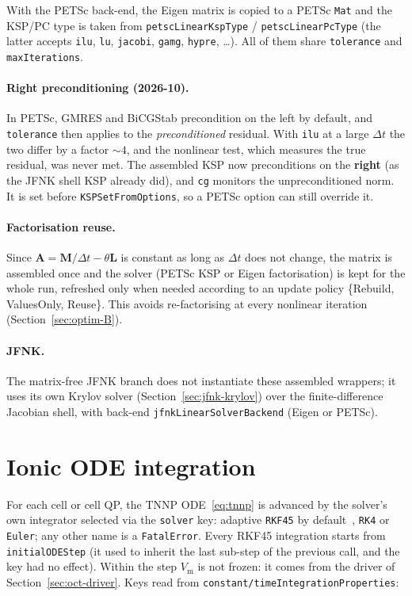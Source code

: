 \documentclass[11pt,a4paper]{article}
\newcommand{\code}[1]{\texttt{\small #1}}
\newcommand{\Vm}{V_{\text{m}}}
\newcommand{\Mmass}{\mathbf{M}}
\newcommand{\Lop}{\mathbf{L}}
\newcommand{\Aimp}{\mathbf{A}}
\begin{document}
With the PETSc back-end, the Eigen matrix is copied to a PETSc \code{Mat} and the
KSP/PC type is taken from \code{petscLinearKspType} / \code{petscLinearPcType}
(the latter accepts \code{ilu}, \code{lu}, \code{jacobi}, \code{gamg}, \code{hypre},
\dots). All of them share \code{tolerance} and \code{maxIterations}.

\paragraph{Right preconditioning (2026-10).} In PETSc, GMRES and BiCGStab
precondition on the left by default, and \code{tolerance} then applies to the
\emph{preconditioned} residual. With \code{ilu} at a large $\Delta t$ the two
differ by a factor $\sim4$, and the nonlinear test, which measures the true
residual, was never met. The assembled KSP now preconditions on the
\textbf{right} (as the JFNK shell KSP already did), and \code{cg} monitors the
unpreconditioned norm. It is set before \code{KSPSetFromOptions}, so a PETSc
option can still override it.

\paragraph{Factorisation reuse.}
Since $\Aimp=\Mmass/\Delta t-\theta\Lop$ is constant as long as $\Delta t$ does not change,
the matrix is assembled once and the solver (PETSc KSP or Eigen
factorisation) is kept for the whole run, refreshed only when needed according to
an update policy \{Rebuild, ValuesOnly, Reuse\}. This avoids
re-factorising at every nonlinear iteration (Section~\ref{sec:optim-B}).

\paragraph{JFNK.}
The matrix-free JFNK branch does not instantiate these assembled wrappers; it uses
its own Krylov solver (Section~\ref{sec:jfnk-krylov}) over the finite-difference
Jacobian shell, with back-end \code{jfnkLinearSolverBackend} (Eigen or PETSc).

\section{Ionic ODE integration}

For each cell or cell QP, the TNNP ODE~\eqref{eq:tnnp} is advanced by
the solver's own integrator selected via the \code{solver} key: adaptive
\code{RKF45} by default~\cite{hairer2}, \code{RK4} or \code{Euler}; any other name
is a \code{FatalError}. Every RKF45 integration starts from \code{initialODEStep}
(it used to inherit the last sub-step of the previous call, and the key had no
effect). Within the step $\Vm$ is not frozen: it comes from the driver of
Section~\ref{sec:oct-driver}. Keys read from
\code{constant/timeIntegrationProperties}:
\end{document}
